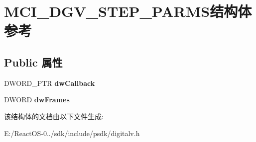 \hypertarget{struct_m_c_i___d_g_v___s_t_e_p___p_a_r_m_s}{}\section{M\+C\+I\+\_\+\+D\+G\+V\+\_\+\+S\+T\+E\+P\+\_\+\+P\+A\+R\+M\+S结构体 参考}
\label{struct_m_c_i___d_g_v___s_t_e_p___p_a_r_m_s}
\subsection*{Public 属性}
\begin{DoxyCompactItemize}
\item 
\mbox{\label{struct_m_c_i___d_g_v___s_t_e_p___p_a_r_m_s_a71c95871a2eb6aacbefe9db2f8304eb3}} 
D\+W\+O\+R\+D\+\_\+\+P\+TR {\bfseries dw\+Callback}
\item 
\mbox{\label{struct_m_c_i___d_g_v___s_t_e_p___p_a_r_m_s_a6c5c66e2a250993dc2b3ac37d4c6bcf8}} 
D\+W\+O\+RD {\bfseries dw\+Frames}
\end{DoxyCompactItemize}


该结构体的文档由以下文件生成\+:\begin{DoxyCompactItemize}
\item 
E\+:/\+React\+O\+S-\/0../sdk/include/psdk/digitalv.\+h\end{DoxyCompactItemize}
